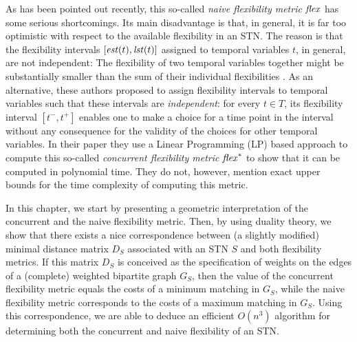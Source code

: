 As has been pointed out recently, this so-called \emph{naive flexibility metric} $\mathit{flex}$ has some serious shortcomings. Its main disadvantage is that, in general, it is far too optimistic with respect to the available flexibility in an STN. The reason is that the flexibility intervals $[\mathit{est}(t), \mathit{lst}(t)]$ assigned to temporal variables $t$, in general, are not independent: The flexibility of two temporal variables together might be substantially smaller than the sum of their individual flexibilities \cite{wilson:2013,wilson:2014}.  As an alternative, these authors proposed to assign flexibility intervals to temporal variables such that these intervals are \emph{independent}: for every $t \in T$,  its flexibility interval $[t^-, t^+]$ enables one to make a choice for a time point in the interval without any consequence for the validity of the choices for other temporal variables. 
In their paper they use a Linear Programming (LP) based approach to compute this so-called \emph{concurrent flexibility metric} $\mathit{flex}^*$ to show that it can be computed in polynomial time. They do not, however, mention exact upper bounds for the time complexity of computing this metric.

In this chapter, we start by presenting a geometric interpretation of the concurrent and the naive flexibility metric. Then, by using duality theory, we show that there exists a nice correspondence between (a slightly modified) minimal distance matrix $D_S$ associated with an STN $S$ and both flexibility metrics. If this matrix $D_S$ is conceived as the specification of weights on the edges of a (complete) weighted bipartite graph $G_S$, then the value of the concurrent flexibility metric equals the costs of a minimum matching in $G_S$, while the naive flexibility metric corresponds to the costs of a maximum matching in $G_S$.  
Using this correspondence, we are able to deduce an efficient $O(n^3)$ algorithm for determining both the concurrent and naive flexibility of an STN.

